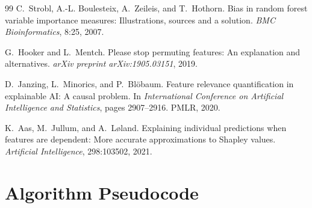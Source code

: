 \documentclass[11pt]{article}
\begin{document}
\begin{thebibliography}{99}
C.~Strobl, A.-L. Boulesteix, A.~Zeileis, and T.~Hothorn.
\newblock Bias in random forest variable importance measures: Illustrations,
  sources and a solution.
\newblock \emph{BMC Bioinformatics}, 8:25, 2007.

G.~Hooker and L.~Mentch.
\newblock Please stop permuting features: An explanation and alternatives.
\newblock \emph{arXiv preprint arXiv:1905.03151}, 2019.

D.~Janzing, L.~Minorics, and P.~Bl{\"o}baum.
\newblock Feature relevance quantification in explainable {AI}: A causal
  problem.
\newblock In \emph{International Conference on Artificial Intelligence and
  Statistics}, pages 2907--2916. PMLR, 2020.

K.~Aas, M.~Jullum, and A.~L{\o}land.
\newblock Explaining individual predictions when features are dependent:
  More accurate approximations to {S}hapley values.
\newblock \emph{Artificial Intelligence}, 298:103502, 2021.

\end{thebibliography}


\appendix

\section{Algorithm Pseudocode}
\label{app:algorithm}
\end{document}
